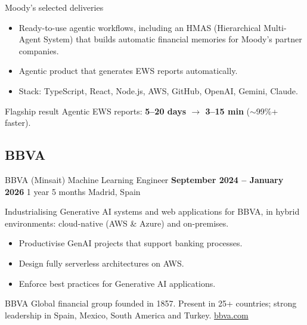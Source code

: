 \documentclass[10pt]{beamer}
\begin{document}
\begin{frame}{Moody's \textperiodcentered{} selected deliveries}
  \begin{itemize}
    \item Ready-to-use \alert{agentic workflows}, including an HMAS
          (Hierarchical Multi-Agent System) that builds automatic financial
          memories for Moody's partner companies.
    \item Agentic product that generates \alert{EWS reports} automatically.
    \item Stack: TypeScript, React, Node.js, AWS, GitHub,
          OpenAI, Gemini, Claude.
  \end{itemize}

  \vspace{0.4em}
  \begin{alertblock}{Flagship result}
    Agentic EWS reports: \textbf{5--20 days $\rightarrow$ 3--15 min}
    ($\sim$99\%+ faster).
  \end{alertblock}
\end{frame}

\subsection{BBVA}

\begin{frame}{BBVA (Minsait) \textperiodcentered{} Machine Learning Engineer}
  \textbf{September 2024 -- January 2026} \hfill 1 year 5 months \textbullet{}
  Madrid, Spain

  \vspace{0.2em}
  Industrialising Generative AI systems and web applications for BBVA, in
  hybrid environments: cloud-native (AWS \& Azure) and on-premises.

  \begin{itemize}
    \item Productivise GenAI projects that support banking processes.
    \item Design fully \alert{serverless} architectures on AWS.
    \item Enforce best practices for Generative AI applications.
  \end{itemize}

  \begin{exampleblock}{BBVA}
    Global financial group founded in 1857. Present in 25+ countries; strong
    leadership in Spain, Mexico, South America and Turkey.
    \hfill \href{https://www.bbva.com/en/}{bbva.com}
  \end{exampleblock}
\end{frame}
\end{document}
